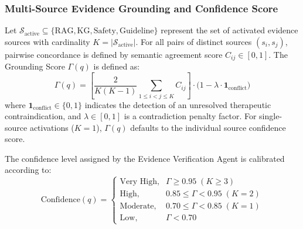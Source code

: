 \documentclass[conference]{IEEEtran}
\begin{document}
\subsubsection{Multi-Source Evidence Grounding and Confidence Score}
Let $\mathcal{S}_{\text{active}} \subseteq \{\text{RAG}, \text{KG}, \text{Safety}, \text{Guideline}\}$ represent the set of activated evidence sources with cardinality $K = |\mathcal{S}_{\text{active}}|$. For all pairs of distinct sources $(s_i, s_j)$, pairwise concordance is defined by semantic agreement score $C_{ij} \in [0, 1]$. The Grounding Score $\Gamma(q)$ is defined as:
\begin{equation}
\Gamma(q) = \left[ \frac{2}{K(K-1)} \sum_{1 \le i < j \le K} C_{ij} \right] \cdot \Big( 1 - \lambda \cdot \mathbf{1}_{\text{conflict}} \Big)
\label{eq:grounding}
\end{equation}
where $\mathbf{1}_{\text{conflict}} \in \{0, 1\}$ indicates the detection of an unresolved therapeutic contraindication, and $\lambda \in [0, 1]$ is a contradiction penalty factor. For single-source activations ($K = 1$), $\Gamma(q)$ defaults to the individual source confidence score.

The confidence level assigned by the Evidence Verification Agent is calibrated according to:
\begin{equation}
\text{Confidence}(q) = 
\begin{cases}
\text{Very High}, & \Gamma \ge 0.95 \; (K \ge 3) \\
\text{High}, & 0.85 \le \Gamma < 0.95 \; (K = 2) \\
\text{Moderate}, & 0.70 \le \Gamma < 0.85 \; (K = 1) \\
\text{Low}, & \Gamma < 0.70
\end{cases}
\label{eq:confidence}
\end{equation}
\end{document}
